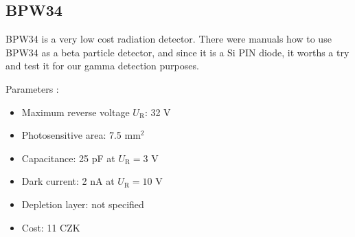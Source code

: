 % 

\subsection{BPW34}
BPW34 is a very low cost radiation detector. There were manuals \cite{betaBPW} how to use BPW34 as a beta particle detector, and since it is a Si PIN diode, it worths a try and test it for our gamma detection purposes.



Parameters \cite{datBPW34}:
\begin{itemize}
\item Maximum reverse voltage $U_\textrm{R}$: 32 V
\item Photosensitive area: 7.5 mm$^2$
\item Capacitance: 25 pF at $U_\textrm{R} = 3$ V
\item Dark current: 2 nA at $U_\textrm{R} = 10$ V
\item Depletion layer: not specified
\item Cost: 11 CZK
\end{itemize}

% 

